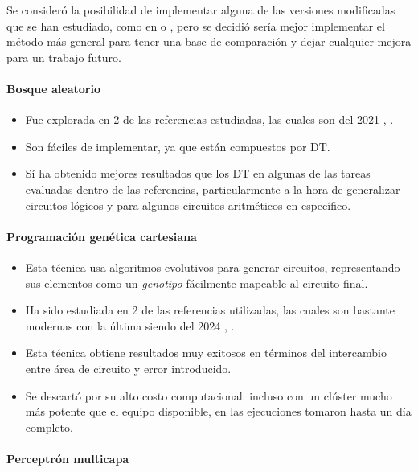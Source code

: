 Se consideró la posibilidad de implementar alguna de las versiones modificadas
que se han estudiado, como en \cite{hu_optdtals_2024} o
\cite{zeng_sampling-based_2021}, pero se decidió sería mejor implementar el
método más general para tener una base de comparación y dejar cualquier mejora
para un trabajo futuro.

\paragraph{Bosque aleatorio}

\begin{itemize}
    \item Fue explorada en 2 de las referencias estudiadas, las cuales son del
      2021 \cite{miyasaka_logic_2021}, \cite{rai_logic_2021}.
    \item Son fáciles de implementar, ya que están compuestos por DT.
    \item Sí ha obtenido mejores resultados que los DT en algunas de las tareas
      evaluadas dentro de las referencias, particularmente a la hora de
      generalizar circuitos lógicos y para algunos circuitos aritméticos en
      específico.
\end{itemize}

\paragraph{Programación genética cartesiana}

\begin{itemize}
    \item Esta técnica usa algoritmos evolutivos para generar circuitos,
      representando sus elementos como un \emph{genotipo} fácilmente mapeable
      al circuito final.
    \item Ha sido estudiada en 2 de las referencias utilizadas, las cuales son
      bastante modernas con la última siendo del 2024
      \cite{berndt_cgp-based_2022}, \cite{prats_ramos_impact_2024}.
    \item Esta técnica obtiene resultados muy exitosos en términos del
      intercambio entre área de circuito y error introducido.
    \item Se descartó por su alto costo computacional: incluso con un clúster
      mucho más potente que el equipo disponible, en
      \cite{berndt_cgp-based_2022} las ejecuciones tomaron hasta un día
      completo.
\end{itemize}

\paragraph{Perceptrón multicapa}

